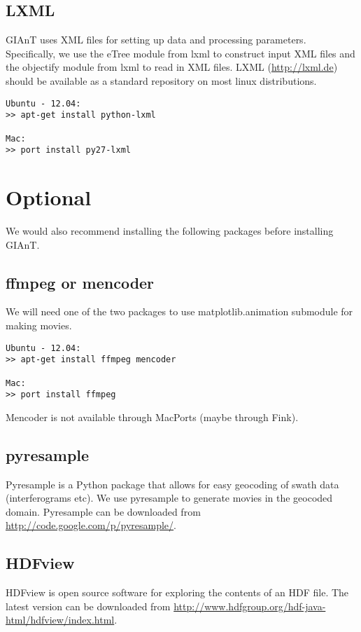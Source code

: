 \subsection{LXML}
GIAnT uses XML files for setting up data and processing parameters. Specifically, we use the eTree module from lxml to construct input XML files and the objectify module from lxml to read in XML files. LXML (\url{http://lxml.de}) should be available as a standard repository on most linux distributions.

\begin{verbatim}
Ubuntu - 12.04:
>> apt-get install python-lxml

Mac:
>> port install py27-lxml
\end{verbatim}

\section{Optional}
We would also recommend installing the following packages before installing GIAnT.

\subsection{ffmpeg or mencoder}
We will need one of the two packages to use matplotlib.animation submodule for making movies.

\begin{verbatim}
Ubuntu - 12.04:
>> apt-get install ffmpeg mencoder

Mac: 
>> port install ffmpeg
\end{verbatim}
Mencoder is not available through MacPorts (maybe through Fink).

\subsection{pyresample}
Pyresample is a Python package that allows for easy geocoding of swath data (interferograms etc). We use pyresample to generate movies in the geocoded domain. Pyresample can be downloaded from \url{http://code.google.com/p/pyresample/}.

\subsection{HDFview}
HDFview is open source software for exploring the contents of an HDF file. The latest version can be downloaded from \url{http://www.hdfgroup.org/hdf-java-html/hdfview/index.html}. 

